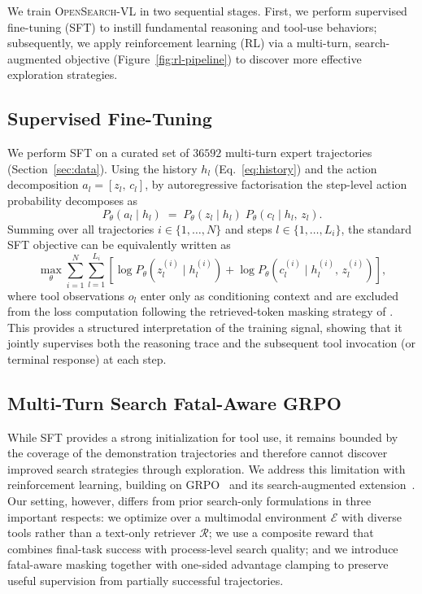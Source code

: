 We train \textsc{OpenSearch-VL} in two sequential stages. First, we perform supervised fine-tuning (SFT) to instill fundamental reasoning and tool-use behaviors; subsequently, we apply reinforcement learning (RL) via a multi-turn, search-augmented objective (Figure~\ref{fig:rl-pipeline}) to discover more effective exploration strategies.

\subsection{Supervised Fine-Tuning}
\label{sec:sft}

We perform SFT on a curated set of $36592$ multi-turn
expert trajectories (Section~\ref{sec:data}).
Using the history $h_l$ (Eq.~\ref{eq:history}) and the action
decomposition $a_l=[z_l,\,c_l]$, by autoregressive factorisation the
step-level action probability decomposes as
\begin{equation}
  P_\theta(a_l \mid h_l)
  \;=\;
  P_\theta(z_l \mid h_l)\;
  P_\theta(c_l \mid h_l,\, z_l).
\end{equation}
Summing over all trajectories $i\in\{1,\dots,N\}$ and steps
$l\in\{1,\dots,L_i\}$, the standard SFT objective can be equivalently
written as
\begin{equation}
  \max_\theta \sum_{i=1}^{N} \sum_{l=1}^{L_i}
  \left[
    \log P_\theta\left(z_l^{(i)} \mid h_l^{(i)}\right)
    +
    \log P_\theta\left(c_l^{(i)} \mid h_l^{(i)},\, z_l^{(i)}\right)
  \right],
  \label{eq:sft}
\end{equation}
where tool observations $o_l$ enter only as conditioning context and are
excluded from the loss computation following the retrieved-token masking
strategy of \citep{jin2025searchr1trainingllmsreason}.
This provides a structured interpretation of the training signal,
showing that it jointly supervises both the reasoning trace and the
subsequent tool invocation (or terminal response) at each step.

\subsection{Multi-Turn Search Fatal-Aware GRPO}
\label{sec:multi-turn-grpo}

While SFT provides a strong initialization for tool use, it remains bounded by the coverage of the demonstration trajectories and therefore cannot discover improved search strategies through exploration. We address this limitation with reinforcement learning, building on GRPO~\citep{shao2024deepseekmath} and its search-augmented extension~\citep{jin2025searchr1trainingllmsreason}. Our setting, however, differs from prior search-only formulations in three important respects: we optimize over a multimodal environment  $\mathcal{E}$ with diverse tools rather than a text-only retriever $\mathcal{R}$; we use a composite reward that combines final-task success with process-level search quality; and we introduce fatal-aware masking together with one-sided advantage clamping to preserve useful supervision from partially successful trajectories.


